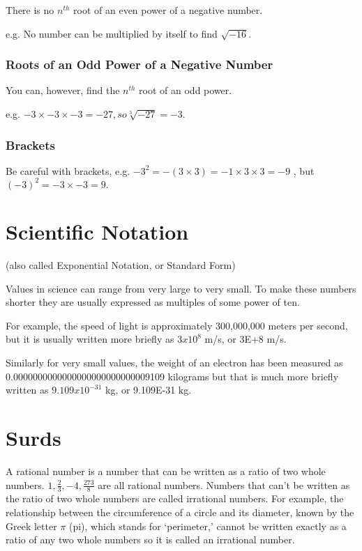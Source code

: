 \documentclass{article}
\begin{document}
There is no $n^{th}$ root of an even power of a negative number.

e.g.	No number can be multiplied by itself to find $\sqrt{-16}$.

\subsubsection{Roots of an Odd Power of a Negative Number}
You can, however, find the $n^{th}$ root of an odd power.

e.g.	$-3 \times -3 \times -3 = -27, so \sqrt[3]{-27}= -3$.

\subsubsection{Brackets}
Be careful with brackets, e.g.
$-3^2 = -(3 \times 3)=-1 \times 3 \times 3 = -9$
, but$(-3)^2 = -3 \times -3 = 9.$

\section{Scientific Notation}
(also called Exponential Notation, or Standard Form)

Values in science can range from very large to very small. To make these numbers shorter they are usually expressed as multiples of some power of ten.

For example, the speed of light is approximately 300,000,000 meters per second, but it is usually written more briefly as $3x10^8$ m/s, or 3E+8 m/s.

Similarly for very small values, the weight of an electron has been measured as\\0.0000000000000000000000000009109 kilograms but that is much more briefly written as $9.109x10^{-31}$ kg, or 9.109E-31 kg.

\newpage

\section{Surds}

A rational number is a number that can be written as a ratio of two whole numbers. $1, \frac{2}{3}, -4, \frac{273}{8}$ are all rational numbers. Numbers that can’t be written as the ratio of two whole numbers are called irrational numbers. For example, the relationship between the circumference of a circle and its diameter, known by the Greek letter $\pi$ (pi), which stands for ‘perimeter,’ cannot be written exactly as a ratio of any two whole numbers so it is called an irrational number.
\end{document}
